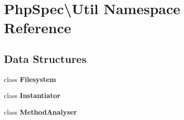 \section{Php\+Spec\textbackslash{}Util Namespace Reference}
\label{namespace_php_spec_1_1_util}
\subsection*{Data Structures}
\begin{DoxyCompactItemize}
\item 
class {\bf Filesystem}
\item 
class {\bf Instantiator}
\item 
class {\bf Method\+Analyser}
\end{DoxyCompactItemize}
